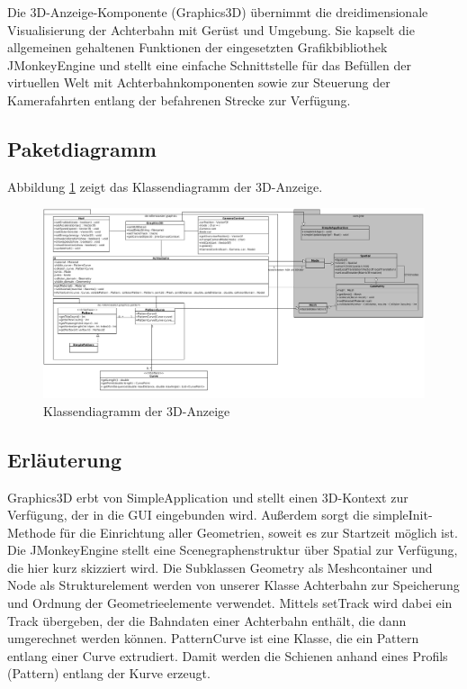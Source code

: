 Die 3D-Anzeige-Komponente (Graphics3D) übernimmt die dreidimensionale Visualisierung der Achterbahn
mit Gerüst und Umgebung. Sie kapselt die allgemeinen gehaltenen Funktionen der eingesetzten
Grafikbibliothek JMonkeyEngine und stellt eine einfache Schnittstelle für das Befüllen 
der virtuellen Welt mit Achterbahnkomponenten sowie zur Steuerung der Kamerafahrten 
entlang der befahrenen Strecke zur Verfügung.

\subsection{Paketdiagramm}
Abbildung \ref{fig:graphics} zeigt das Klassendiagramm der 3D-Anzeige.

\begin{figure}
\includegraphics[width=\linewidth]{bilder/klassendiagramm_006}
\caption{Klassendiagramm der 3D-Anzeige}
\label{fig:graphics}
\end{figure}

\subsection{Erläuterung}

Graphics3D erbt von SimpleApplication und stellt einen 3D-Kontext zur Verfügung, der in die GUI eingebunden wird. Außerdem sorgt die simpleInit-Methode für die Einrichtung aller Geometrien, soweit es zur Startzeit möglich ist.
Die JMonkeyEngine stellt eine Scenegraphenstruktur über Spatial zur Verfügung, die hier kurz skizziert wird. Die Subklassen Geometry als Meshcontainer und Node als Strukturelement werden von unserer Klasse Achterbahn 
zur Speicherung und Ordnung der Geometrieelemente verwendet. Mittels setTrack wird dabei ein Track übergeben, der die Bahndaten einer Achterbahn enthält, die dann umgerechnet werden können. PatternCurve ist eine Klasse, die ein Pattern entlang einer Curve extrudiert. 
Damit werden die Schienen anhand eines Profils (Pattern) entlang der Kurve erzeugt. 

